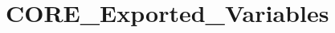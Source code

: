 \hypertarget{group___c_o_r_e___exported___variables}{}\section{C\+O\+R\+E\+\_\+\+Exported\+\_\+\+Variables}
\label{group___c_o_r_e___exported___variables}
